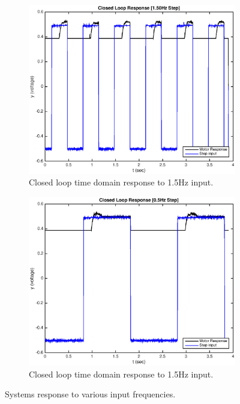 \documentclass[11pt,a4paper]{article}
\begin{document}
\begin{enumerate}
\begin{figure}[H]
	  \begin{subfigure}{0.5\textwidth}
	  \includegraphics[width=0.9\linewidth]{Matlab_Code/Figures/D2_1_50Hz.eps}
	  \caption{Closed loop time domain response to 1.5Hz input.}
	  \label{fig:subim2}
	  \end{subfigure}
	  \begin{subfigure}{0.5\textwidth}
	  \includegraphics[width=0.9\linewidth]{Matlab_Code/Figures/D2_0_5Hz.eps}
	  \caption{Closed loop time domain response to 1.5Hz input.}
	  \label{fig:subim2}
	  \end{subfigure}
	\caption{\label{fig:freqimpact}Systems response to various input frequencies.}
	\end{figure}
	

\end{enumerate}
\end{document}

